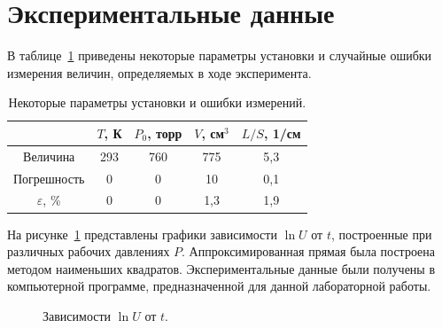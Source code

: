 \documentclass[a4paper,12pt]{article} %
\begin{document}
\newpage
\section{Экспериментальные данные}
	В таблице~\ref{table:parametri} приведены некоторые параметры установки и случайные ошибки измерения величин, определяемых в ходе эксперимента.
	\begin{table}[H]
		\caption{Некоторые параметры установки и ошибки измерений.}
		\label{table:parametri}
		\begin{tabular}{|c|c|c|c|c|}
			\hline
                  			  & $T$, К & $P_0$, торр & $V$, см$^3$ & $L/S$, 1/см \\ \hline
			Величина          & 293    & 760         & 775         & 5,3         \\ \hline
			Погрешность       & 0      & 0           & 10          & 0,1         \\ \hline
			$\varepsilon$, \% & 0      & 0           & 1,3         & 1,9         \\ \hline
		\end{tabular}
	\end{table}	
	На рисунке~\ref{ris:Graph_1} представлены графики зависимости $\ln U$ от $t$, построенные при различных рабочих давлениях $P$. Аппроксимированная прямая была построена методом наименьших квадратов. Экспериментальные данные были получены в компьютерной программе, предназначенной для данной лабораторной работы.
	\begin{figure}[H]
		\caption{Зависимости $\ln U$ от $t$.}
		\label{ris:Graph_1}
	\end{figure}
\end{document}
